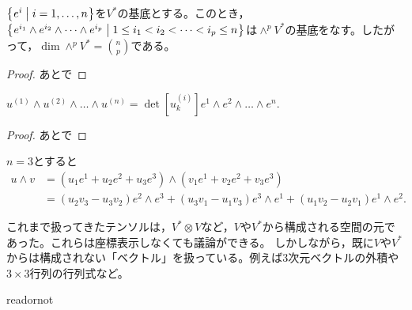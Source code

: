 \documentclass[uplatex]{jsarticle}
\begin{document}
\begin{prop}
  $\Set{\hspace{-1.8pt} e^{i} | i = 1,\dots, n \hspace{-1.8pt}}$を$V^{*}$の基底とする。このとき，$\Set{\hspace{-1.8pt} e^{i_{1}} \wedge e^{i_{2}} \wedge \dots \wedge e^{i_{p}} | 1 \le i_{1} < i_{2} < \dots < i_{p} \le n \hspace{-1.8pt}}$は$\wedge^{p} V^{*}$の基底をなす。したがって，$\dim \wedge^{p} V^{*} = \binom{n}{p}$である。
\end{prop}
\begin{proof}
  あとで
\end{proof}

\begin{hodai}
  $u^{(1)} \wedge u^{(2)} \wedge \dots \wedge u^{(n)} = \det [u_{k}^{(i)}] e^{1} \wedge e^{2} \wedge \dots \wedge e^{n}$.
\end{hodai}
\begin{proof}
  あとで
\end{proof}

\begin{rei}
  $n = 3$とすると
  \begin{align*}
    u \wedge v &= (u_{1} e^{1} + u_{2} e^{2} + u_{3} e^{3}) \wedge (v_{1} e^{1} + v_{2} e^{2} + v_{3} e^{3}) \\
    &= (u_{2}v_{3} - u_{3}v_{2}) e^{2} \wedge e^{3} + (u_{3}v_{1} - u_{1}v_{3}) e^{3} \wedge e^{1} + (u_{1}v_{2} - u_{2}v_{1}) e^{1} \wedge e^{2}.
  \end{align*}
\end{rei}

\sukima{}\par
これまで扱ってきたテンソルは，$V^{*} \otimes V$など，$V$や$V^{*}$から構成される空間の元であった。これらは座標表示しなくても議論ができる。
しかしながら，既に$V$や$V^{*}$からは構成されない「ベクトル」を扱っている。例えば3次元ベクトルの外積や$3 \times 3$行列の行列式など。







\expandafter\ifx\csname readornot\endcsname\relax
  
\end{document}
